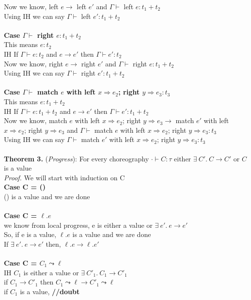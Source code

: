 \documentclass{article}
\begin{document}
Now we know, left $e \to$ left $e'$ and $\Gamma \vdash$ left $e : t_1+t_2$ \\
Using IH we can say $\Gamma \vdash$ left $ e' : t_1+t_2$ \\\\
\textbf{Case $\Gamma \vdash$ right $e : t_1+t_2$ } \\
This means $e : t_2$ \\
IH If $\Gamma \vdash e : t_2$ and  $e \to e'$ then $\Gamma \vdash e' : t_2$ \\
Now we know, right $e \to$ right $e'$ and $\Gamma \vdash$ right $e : t_1+t_2$ \\
Using IH we can say $\Gamma \vdash$ right $ e' : t_1+t_2$ \\\\

\textbf{Case $\Gamma \vdash$ match $e$ with left $x \Rightarrow e_2 $; right $ y \Rightarrow e_3 : t_3$ } \\
This means $e : t_1 + t_2$ \\
IH If $\Gamma \vdash e : t_1+t_2$ and  $e \to e'$ then $\Gamma \vdash e' : t_1+t_2$ \\
Now we know, match $e$ with left $x \Rightarrow e_2 $; right $ y \Rightarrow e_3 \to$
match $e'$ with left $x \Rightarrow e_2 $; right $ y \Rightarrow e_3$ and $\Gamma \vdash$ match $e$ with left $x \Rightarrow e_2 $; right $ y \Rightarrow e_3 : t_3$ \\
Using IH we can say $\Gamma \vdash$ match $e'$ with left $x \Rightarrow e_2 $; right $ y \Rightarrow e_3 : t_3$ \\\\


\textbf{Theorem 3.} (\textit{Progress}): For every choreography $\cdot \vdash C : \tau$ either $  \exists \ C'.\ C \to C'$  or $C$ is a value
  \\
\textit{Proof.} We will start with induction on C \\
\textbf{Case C = ()} \\
() is a value and we are done \\ \\
\textbf{Case C = $\ell.e$} \\
we know from local progress, e is either a value or $ \exists \ e'.\ e \to e'$  \\
So, if e is a value, $\ell.e$ is a value and we are done \\
If $ \exists \ e'.\ e \to e'$ then, $ \ell. e \to \ell.e'$
\\ \\
\textbf{Case C = $C_1 \leadsto \ell$} \\
IH $C_1$ is either a value or $  \exists \ C'_1.\ C_1 \to C'_1 $ \\
if $C_1 \to C'_1$ then $C_1 \leadsto \ell \to C'_1 \leadsto \ell$ \\
if $C_1$ is a value,  \textbf{//doubt} \\
\end{document}
